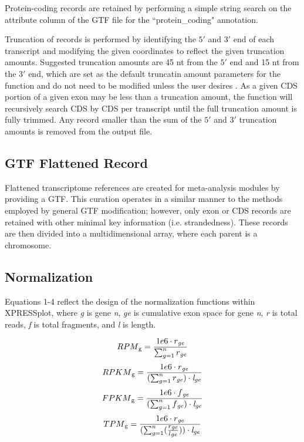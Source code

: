 \documentclass[10pt, oneside]{article}
\begin{document}
Protein-coding records are retained by performing a simple string search on the attribute column of the GTF file for the ``protein\_coding" annotation. \par

Truncation of records is performed by identifying the $5'$ and $3'$ end of each transcript and modifying the given coordinates to reflect the given truncation amounts. Suggested truncation amounts are 45 nt from the $5'$ end and 15 nt from the $3'$ end, which are set as the default truncatin amount parameters for the function and do not need to be modified unless the user desires \cite{ingolia_meth}. As a given CDS portion of a given exon may be less than a truncation amount, the function will recursively search CDS by CDS per transcript until the full truncation amount is fully trimmed. Any record smaller than the sum of the $5'$ and $3'$ truncation amounts is removed from the output file. \par

\subsection{GTF Flattened Record}
Flattened transcriptome references are created for meta-analysis modules by providing a GTF. This curation operates in a similar manner to the methods employed by general GTF modification; however, only exon or CDS records are retained with other minimal key information (i.e. strandedness). These records are then divided into a multidimensional array, where each parent is a chromosome. \par

\subsection{Normalization}
Equations 1-4 reflect the design of the normalization functions within XPRESSplot, where \textit{g} is gene \textit{n}, \textit{ge} is cumulative exon space for gene \textit{n}, \textit{r} is total reads, \textit{f} is total fragments, and \textit{l} is length.

  \begin{equation}
    RPM\textsubscript{g} = \frac{1e6 \cdot r\textsubscript{\textit{ge}}}{\sum_{g=1}^{n} r\textsubscript{\textit{ge}}}
  \end{equation}
  \begin{equation}
    RPKM\textsubscript{g} = \frac{1e6 \cdot r\textsubscript{\textit{ge}}}{(\sum_{g=1}^{n} r\textsubscript{\textit{ge}}) \cdot \textit{l} \textsubscript{\textit{ge}}}
  \end{equation}
  \begin{equation}
    FPKM\textsubscript{g} = \frac{1e6 \cdot f\textsubscript{\textit{ge}}}{(\sum_{g=1}^{n} f\textsubscript{\textit{ge}}) \cdot \textit{l} \textsubscript{\textit{ge}}}
  \end{equation}
  \begin{equation}
    TPM\textsubscript{g} = \frac{1e6 \cdot r\textsubscript{\textit{ge}}}{(\sum_{g=1}^{n} (\frac{r\textsubscript{\textit{ge}}}{l\textsubscript{\textit{ge}}})) \cdot \textit{l} \textsubscript{\textit{ge}}}
  \end{equation}
\end{document}
